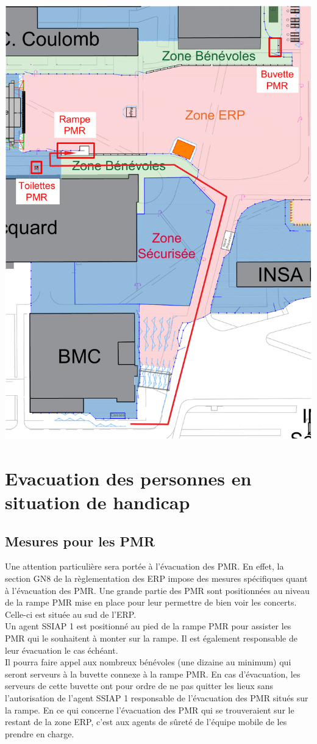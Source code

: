 \documentclass[hidelinks, paper=a4, fontsize=13pt]{report}
\begin{document}
\begin{center}
\includegraphics[width=.8\textwidth,keepaspectratio]{Exports/Plan_24h_44eme-PMR_sud}
\end{center}

\newpage
\section{Evacuation des personnes en situation de handicap}

\subsection{Mesures pour les PMR}

Une attention particulière sera portée à l’évacuation des PMR. En effet, la section GN8 de la règlementation des ERP impose des mesures spécifiques quant à l’évacuation des PMR.
Une grande partie des PMR sont positionnées au niveau de la rampe PMR mise en place pour leur permettre de bien voir les concerts. Celle-ci est située au sud de l’ERP.\\

Un agent SSIAP 1 est positionné au pied de la rampe PMR pour assister les PMR qui le souhaitent à monter sur la rampe. Il est également responsable de leur évacuation le cas échéant.\\
Il pourra faire appel aux nombreux bénévoles (une dizaine au minimum) qui seront serveurs à la buvette connexe à la rampe PMR. En cas d’évacuation, les serveurs de cette buvette ont pour ordre de ne pas quitter les lieux sans l’autorisation de l’agent SSIAP 1 responsable de l’évacuation des PMR situés sur la rampe.
En ce qui concerne l’évacuation des PMR qui se trouveraient sur le restant de la zone ERP, c’est aux agents de sûreté de l'équipe mobile de les prendre en charge. 
\end{document}
